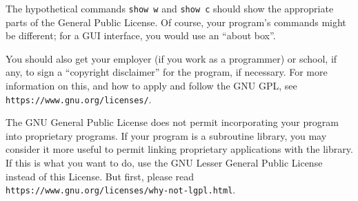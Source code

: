 \documentclass[11pt,twoside,fleqn,openright,titlepage]{cslreport}
\begin{document}
\begin{small}
\begin{enumerate}
The hypothetical commands {\tt show w} and {\tt show c} should show
the appropriate
parts of the General Public License.  Of course, your program's commands
might be different; for a GUI interface, you would use an ``about box''.

You should also get your employer (if you work as a programmer) or
school, if any, to sign a ``copyright disclaimer'' for the program, if
necessary.  For more information on this, and how to apply and follow
the GNU GPL, see \texttt{https://www.gnu.org/licenses/}.

The GNU General Public License does not permit incorporating your
program into proprietary programs.  If your program is a subroutine
library, you may consider it more useful to permit linking proprietary
applications with the library.  If this is what you want to do, use
the GNU Lesser General Public License instead of this License.  But
first, please read \texttt{https://www.gnu.org/licenses/why-not-lgpl.html}.

\end{enumerate}
\end{small}
\end{document}
